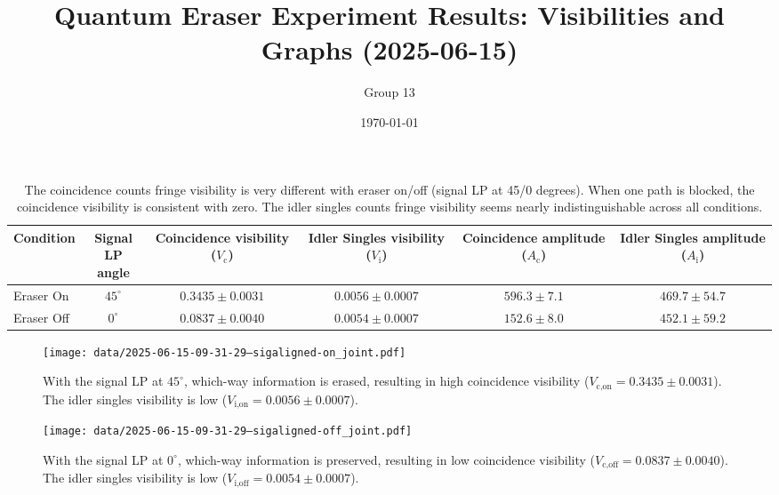 \documentclass{article}
\title{Quantum Eraser Experiment Results: Visibilities and Graphs (2025-06-15)}
\author{Group 13} %
\date{\today}
\begin{document}
\pagestyle{empty} %

\begin{table}[h!]
\centering
\begin{tabular}{lccccc}
\toprule
Condition & \makecell{Signal \\ LP angle} & \makecell{Coincidence \\ visibility ($V_{\text{c}}$)} & \makecell{Idler Singles \\ visibility ($V_{\text{i}}$)} & \makecell{Coincidence \\ amplitude ($A_{\text{c}}$)} & \makecell{Idler Singles \\ amplitude ($A_{\text{i}}$)} \\
\midrule
Eraser On   & $45^\circ$ & $0.3435 \pm 0.0031$ & $0.0056 \pm 0.0007$ & $596.3 \pm 7.1$ & $469.7 \pm 54.7$ \\
Eraser Off  & $0^\circ$  & $0.0837 \pm 0.0040$ & $0.0054 \pm 0.0007$ & $152.6 \pm 8.0$ & $452.1 \pm 59.2$ \\
\bottomrule
\end{tabular}
\caption*{
  The coincidence counts fringe visibility is very different with eraser on/off (signal LP at 45/0 degrees).
  When one path is blocked, the coincidence visibility is consistent with zero.
  The idler singles counts fringe visibility seems nearly indistinguishable across all conditions.
}
\end{table}

\begin{figure}[h!]
\centering
\texttt{[image: data/2025-06-15-09-31-29--sigaligned-on\_joint.pdf]}
\caption*{
  With the signal LP at $45^\circ$, which-way information is erased, resulting in high coincidence visibility ($V_{\text{c,on}}=0.3435 \pm 0.0031$). The idler singles visibility is low ($V_{\text{i,on}}=0.0056 \pm 0.0007$).
}
\end{figure}

\begin{figure}[h!]
\centering
\texttt{[image: data/2025-06-15-09-31-29--sigaligned-off\_joint.pdf]}
\caption*{
  With the signal LP at $0^\circ$, which-way information is preserved, resulting in low coincidence visibility ($V_{\text{c,off}}=0.0837 \pm 0.0040$). The idler singles visibility is low ($V_{\text{i,off}}=0.0054 \pm 0.0007$).
}
\end{figure}

\begin{comment}
\begin{figure}[h!]
\centering
\texttt{[image: data/2025-06-15-09-31-29--sigaligned-blocked\_joint.pdf]}
\caption*{
  With one path blocked, no interference is expected, and coincidence visibility is near zero ($V_{\text{c,blocked}}=0.1887 \pm 1.6822$). The idler singles visibility is also low ($V_{\text{i,blocked}}=0.0047 \pm 0.0005$).
}
\end{figure}
\end{comment}
\end{document}
